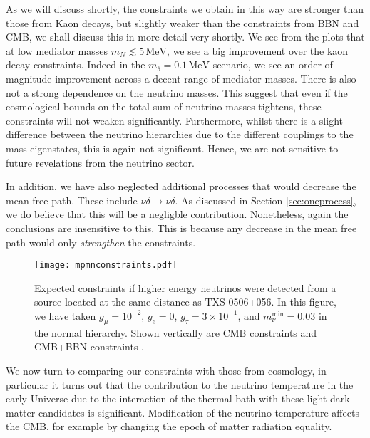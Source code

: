 \noindent As we will discuss shortly, the constraints we obtain in this way are stronger than those from Kaon decays, but slightly weaker than the constraints from BBN and CMB, we shall discuss this in more detail very shortly.  We see from the plots that at low mediator masses $m_N \lesssim 5\, \textrm{MeV}$, we see a big improvement over the kaon decay constraints. Indeed in the $m_\delta = 0.1\,\textrm{MeV}$ scenario, we see an order of magnitude improvement across a decent range of mediator masses. There is also not a strong dependence on the neutrino masses. This suggest that even if the cosmological bounds on the total sum of neutrino masses tightens, these constraints will not weaken significantly. Furthermore, whilst there is a slight difference between the neutrino hierarchies due to the different couplings to the mass eigenstates, this is again not significant. Hence, we are not sensitive to future revelations from the neutrino sector.

In addition, we have also neglected additional processes that would decrease the mean free path. These include $\nu\delta \rightarrow \nu\delta$. As discussed in Section \ref{sec:oneprocess}, we do believe that this will be a negligble contribution. Nonetheless, again the conclusions are insensitive to this. This is because any decrease in the mean free path would only \emph{strengthen} the constraints.

\begin{figure}[t]
 \centering
 \texttt{[image: mpmnconstraints.pdf]}
 \caption{Expected constraints if higher energy neutrinos were detected from a source located at the same distance as TXS 0506+056. In this figure, we have taken $g_\mu = 10^{-2}$, $g_e = 0$, $g_\tau = 3 \times 10^{-1}$, and $m_\nu^{\mathrm{min}} = 0.03$ in the normal hierarchy. Shown vertically are CMB constraints \cite{Boehm} and CMB+BBN constraints \cite{Nollett2015}.}
 \label{fig:mpmn}
\end{figure}

We now turn to comparing our constraints with those from cosmology, in particular it turns out that the contribution to the neutrino temperature in the early Universe due to the interaction of the thermal bath with these light dark matter candidates is significant.  Modification of the neutrino temperature affects the CMB, for example by changing the epoch of matter radiation equality.

